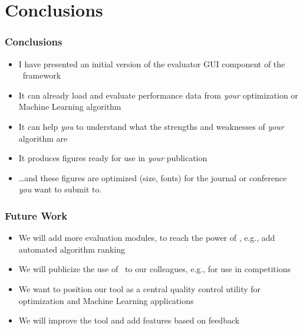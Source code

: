 \section{Conclusions}%
%
\begin{frame}%
\frametitle{Conclusions}%
\begin{itemize}%
\item I have presented an initial version of the evaluator GUI component of the \optimizationBenchmarking\ framework%
\item<2-> It can already load and evaluate performance data from \emph{your} optimization or Machine Learning algorithm%
\item<3-> It can help \emph{you} to understand what the strengths and weaknesses of \emph{your} algorithm are%
\item<4-> It produces figures ready for use in \emph{your} publication%
\item<5-> {\dots}and these figures are optimized (size, fonts) for the journal or conference \emph{you} want to submit to.%
\end{itemize}%
\end{frame}
%
%
\begin{frame}%
\frametitle{Future Work}%
\begin{itemize}%
\item We will add more evaluation modules, to reach the power of \tspSuite\expandafter\scitep{\tspSuiteReferences}, e.g., add automated algorithm ranking%
\item<2-> We will publicize the use of \optimizationBenchmarking\ to our colleagues, e.g., for use in competitions%
\item<3-> We want to position our tool as a central quality control utility for optimization and Machine Learning applications%
\item<4-> We will improve the tool and add features based on feedback%
\end{itemize}%
\end{frame}%